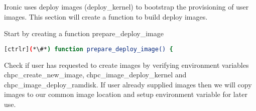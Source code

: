 	Ironic uses deploy images (deploy\_kernel) to bootstrap the provisioning of user images.  This section will create a function to build deploy images. 

	Start by creating a function prepare\_deploy\_image

\begin{lstlisting}[language=bash,keywords={}]
[ctrlr](*\#*) function prepare_deploy_image() {
\end{lstlisting}

	Check if user has requested to create images by verifying environment variables chpc\_create\_new\_image, chpc\_image\_deploy\_kernel and chpc\_image\_deploy\_ramdisk. If user already supplied images then we will copy images to our common image location and setup environment variable for later use.

